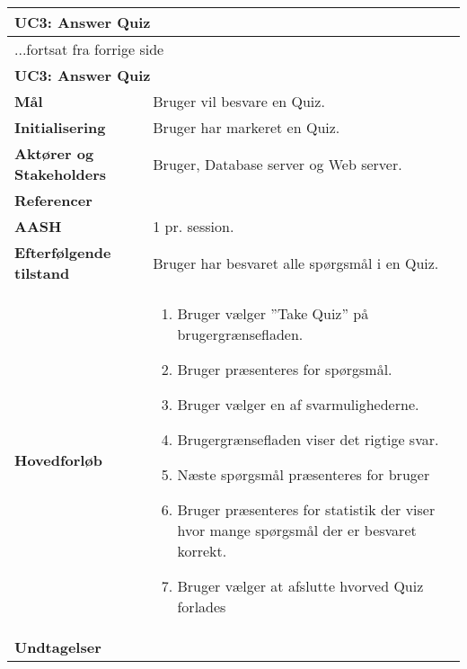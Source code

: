 \begin{center} \centering \label{ucAnswerQuiz}
	\begin{longtable}{|p{4.6cm}|p{9.4cm}|}  %
		\hline
		\multicolumn{2}{|l|}{\textbf{UC3: Answer Quiz}} \\\hline
		\endfirsthead
		
		\multicolumn{2}{l}{...fortsat fra forrige side} \\ \hline %
		\multicolumn{2}{|l|}{\textbf{UC3: Answer Quiz}} \\\hline
		\endhead	
		
		\textbf{Mål}						&Bruger vil besvare en Quiz.
		\\\hline
		\textbf{Initialisering}			&Bruger har markeret en Quiz.
		\\\hline
		\textbf{Aktører og Stakeholders}	&Bruger, Database server og Web server.
		\\\hline 
		\textbf{Referencer}				&
		\\\hline
		\textbf{AASH}					&1 pr. session.
		\\\hline
		\textbf{Efterfølgende tilstand}	&Bruger har besvaret alle spørgsmål i en Quiz.
		\\\hline
		\textbf{Hovedforløb}					
			&\begin{enumerate}
			\item Bruger vælger ''Take Quiz'' på brugergrænsefladen.
			\item\label{ucAnswerQuizPresent} Bruger præsenteres for spørgsmål.
			\item Bruger vælger en af svarmulighederne. 
			\item Brugergrænsefladen viser det rigtige svar.

			\item\label{ucAnswerQuizEnd} Næste spørgsmål præsenteres for bruger \newline
			[Punkt \ref{ucAnswerQuizPresent} - \ref{ucAnswerQuizEnd} gentages indtil der ikke er flere spørgsmål i Quizzen]
			\item Bruger præsenteres for statistik der viser hvor mange spørgsmål der er besvaret korrekt.
			\item Bruger vælger at afslutte hvorved Quiz forlades


			\end{enumerate}\\\hline
		\textbf{Undtagelser}
			&			
			\\\hline
	\end{longtable} 
\end{center}